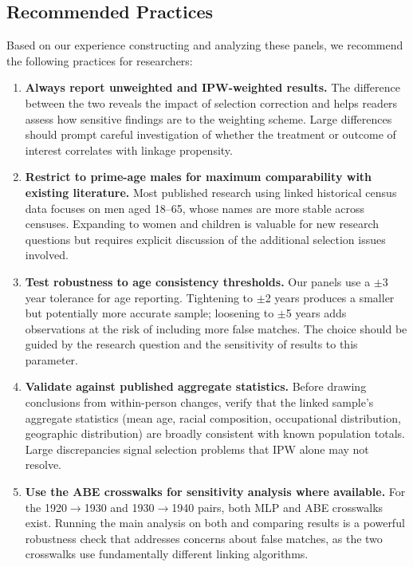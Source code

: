 \documentclass[12pt]{article}
\begin{document}
\subsection{Recommended Practices}

Based on our experience constructing and analyzing these panels, we recommend the following practices for researchers:

\begin{enumerate}
\item \textbf{Always report unweighted and IPW-weighted results.} The difference between the two reveals the impact of selection correction and helps readers assess how sensitive findings are to the weighting scheme. Large differences should prompt careful investigation of whether the treatment or outcome of interest correlates with linkage propensity.

\item \textbf{Restrict to prime-age males for maximum comparability with existing literature.} Most published research using linked historical census data focuses on men aged 18--65, whose names are more stable across censuses. Expanding to women and children is valuable for new research questions but requires explicit discussion of the additional selection issues involved.

\item \textbf{Test robustness to age consistency thresholds.} Our panels use a $\pm$3 year tolerance for age reporting. Tightening to $\pm$2 years produces a smaller but potentially more accurate sample; loosening to $\pm$5 years adds observations at the risk of including more false matches. The choice should be guided by the research question and the sensitivity of results to this parameter.

\item \textbf{Validate against published aggregate statistics.} Before drawing conclusions from within-person changes, verify that the linked sample's aggregate statistics (mean age, racial composition, occupational distribution, geographic distribution) are broadly consistent with known population totals. Large discrepancies signal selection problems that IPW alone may not resolve.

\item \textbf{Use the ABE crosswalks for sensitivity analysis where available.} For the 1920$\rightarrow$1930 and 1930$\rightarrow$1940 pairs, both MLP and ABE crosswalks exist. Running the main analysis on both and comparing results is a powerful robustness check that addresses concerns about false matches, as the two crosswalks use fundamentally different linking algorithms.
\end{enumerate}
\end{document}
